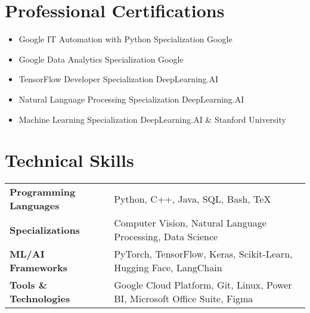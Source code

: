 \documentclass[a4paper,10pt]{article}
\begin{document}
\section{Professional Certifications}
\begin{itemize}[nosep, leftmargin=1em, itemsep=2pt, label=\textbullet]
\item Google IT Automation with Python Specialization \hfill Google
\item Google Data Analytics Specialization \hfill Google
\item TensorFlow Developer Specialization \hfill DeepLearning.AI
\item Natural Language Processing Specialization \hfill DeepLearning.AI
\item Machine Learning Specialization \hfill DeepLearning.AI \& Stanford University
\end{itemize}

\section{Technical Skills}
\begin{tabularx}{\linewidth}{@{}l X@{}}
\textbf{Programming Languages} & Python, C++, Java, SQL, Bash, TeX \\
\textbf{Specializations} & Computer Vision, Natural Language Processing, Data Science \\
\textbf{ML/AI Frameworks} & PyTorch, TensorFlow, Keras, Scikit-Learn, Hugging Face, LangChain \\
\textbf{Tools \& Technologies} & Google Cloud Platform, Git, Linux, Power BI, Microsoft Office Suite, Figma \\
\end{tabularx}
\end{document}
